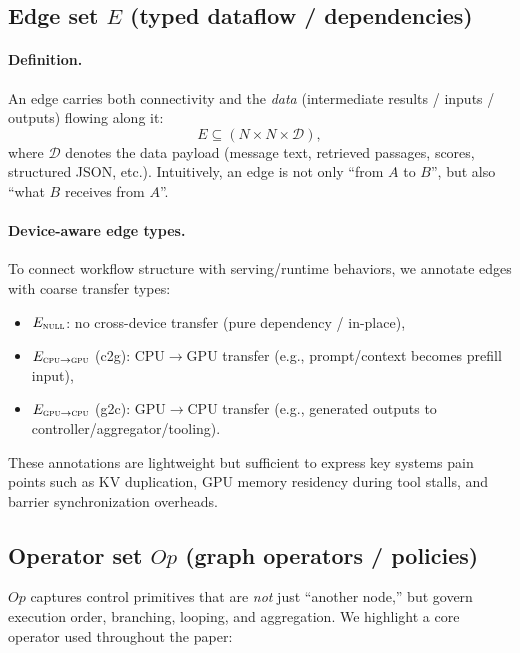 \subsection{Edge set $E$ (typed dataflow / dependencies)}
\label{subsec:edges}

\paragraph{Definition.}
An edge carries both connectivity and the \emph{data} (intermediate results / inputs / outputs) flowing along it:
\begin{equation}
\label{eq:edges}
E \subseteq (N \times N \times \mathcal{D}),
\end{equation}
where $\mathcal{D}$ denotes the data payload (message text, retrieved passages, scores, structured JSON, etc.).
Intuitively, an edge is not only “from $A$ to $B$”, but also “what $B$ receives from $A$”.

\paragraph{Device-aware edge types.}
To connect workflow structure with serving/runtime behaviors, we annotate edges with coarse transfer types:
\begin{itemize}
    \item $E_{\textsc{null}}$: no cross-device transfer (pure dependency / in-place),
    \item $E_{\textsc{cpu}\rightarrow\textsc{gpu}}$ (c2g): CPU$\rightarrow$GPU transfer (e.g., prompt/context becomes prefill input),
    \item $E_{\textsc{gpu}\rightarrow\textsc{cpu}}$ (g2c): GPU$\rightarrow$CPU transfer (e.g., generated outputs to controller/aggregator/tooling).
\end{itemize}
These annotations are lightweight but sufficient to express key systems pain points such as KV duplication,
GPU memory residency during tool stalls, and barrier synchronization overheads.

\subsection{Operator set $Op$ (graph operators / policies)}
\label{subsec:ops}

$Op$ captures control primitives that are \emph{not} just “another node,” but govern execution order, branching, looping, and aggregation.
We highlight a core operator used throughout the paper:

